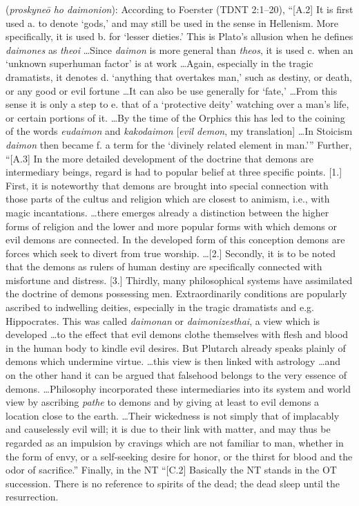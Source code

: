 \item[Demon worship,]

(\textit{proskyneō ho daimonion}):
According to Foerster (TDNT 2:1--20), ``[A.2] It is first used a. to denote `gods,' and may still be used in the sense in Hellenism. More specifically, it is used b. for `lesser dieties.' This is Plato's allusion when he defines \emph{daimones} as \emph{theoi} \ldots Since \emph{daimon} is more general than \emph{theos}, it is used c. when an `unknown superhuman factor' is at work \ldots Again, especially in the tragic dramatists, it denotes d. `anything that overtakes man,' such as destiny, or death, or any good or evil fortune \ldots It can also be use generally for `fate,' \ldots From this sense it is only a step to e. that of a `protective deity' watching over a man's life, or certain portions of it. \ldots By the time of the Orphics this has led to the coining of the words \emph{eudaimon} and \emph{kakodaimon} [\emph{evil demon}, my translation] \ldots In Stoicism  \emph{daimon} then became f. a term for the `divinely related element in man.''' Further, ``[A.3] In the more detailed development of the doctrine that demons are intermediary beings, regard is had to popular belief at three specific points. [1.] First, it is noteworthy that demons are brought into special connection with those parts of the cultus  and religion which are closest to animism, i.e., with magic incantations. \ldots there emerges already a distinction between the higher forms of religion and the lower and more popular forms with which demons or evil demons are connected. In the developed form of this conception demons are forces which seek to divert from true worship. \ldots [2.] Secondly, it is to be noted that the demons as rulers of human destiny are specifically connected with misfortune and distress. [3.] Thirdly, many philosophical systems have assimilated the doctrine of demons possessing men. Extraordinarily conditions are popularly ascribed to indwelling deities, especially in the tragic dramatists and e.g. Hippocrates. This was called \emph{daimonan} or \emph{daimonizesthai}, a view which is developed \ldots to the effect that evil demons clothe themselves with flesh and blood in the human body to kindle evil desires. But Plutarch already speaks plainly of demons which undermine virtue. \ldots this view is then linked with astrology \ldots and on the other hand it can be argued that falsehood belongs to the very essence of demons. \ldots Philosophy incorporated these intermediaries  into its system and world view by ascribing \emph{pathe} to demons and by giving at least to evil demons a location close to the earth. \ldots Their wickedness is not simply that of implacably and causelessly evil will; it is due to their link with matter, and may thus be regarded as an impulsion by cravings which are not familiar to man, whether in the form of envy, or a self-seeking desire for honor, or the thirst for blood and the odor of sacrifice.'' Finally, in the NT ``[C.2] Basically the NT stands in the OT succession. There is no reference to spirits of the dead; the dead sleep until the resurrection. 
